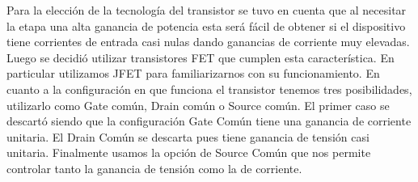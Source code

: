 \documentclass[a4paper, 10pt, spanish]{article}
\begin{document}
Para la elección de la tecnología del transistor se tuvo en cuenta que al necesitar la etapa una alta ganancia de potencia esta será fácil de obtener si el dispositivo tiene corrientes de entrada casi nulas dando ganancias de corriente muy elevadas. Luego se decidió utilizar transistores FET que cumplen esta característica. En particular utilizamos JFET para familiarizarnos con su funcionamiento. En cuanto a la configuración en que funciona el transistor tenemos tres posibilidades, utilizarlo como Gate común, Drain común o Source común. El primer caso se descartó siendo que la configuración Gate Común tiene una ganancia de corriente unitaria. El Drain Común se descarta pues tiene ganancia de tensión casi unitaria. Finalmente usamos la opción de Source Común que nos permite controlar tanto la ganancia de tensión como la de corriente.
\end{document}
